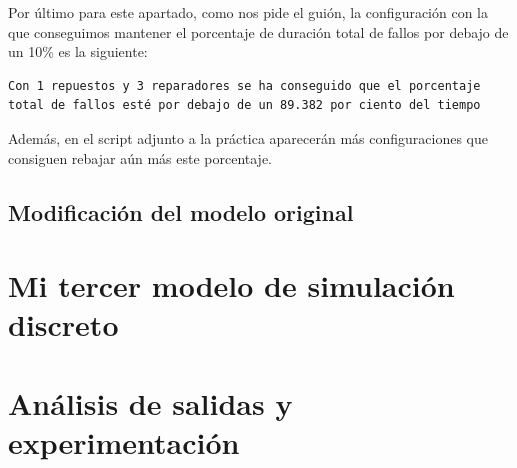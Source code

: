 \documentclass[12pt, spanish]{article}
\begin{document}
Por último para este apartado, como nos pide el guión, la configuración con la que conseguimos mantener el porcentaje de duración total de fallos por debajo de un 10\% es la siguiente:

\begin{lstlisting}
Con 1 repuestos y 3 reparadores se ha conseguido que el porcentaje total de fallos esté por debajo de un 89.382 por ciento del tiempo
\end{lstlisting}

Además, en el script adjunto a la práctica aparecerán más configuraciones que consiguen rebajar aún más este porcentaje.

\subsection{Modificación del modelo original}


\section{Mi tercer modelo de simulación discreto}

\section{Análisis de salidas y experimentación}

%
%
\end{document}
